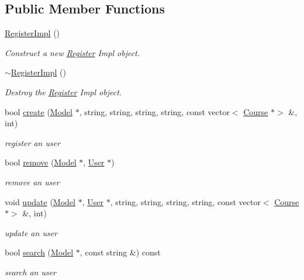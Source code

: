 \subsection*{Public Member Functions}
\begin{DoxyCompactItemize}
\item 
\hyperlink{classRegisterImpl_a601b77faf4f07f51170821a189fed94f}{Register\+Impl} ()
\begin{DoxyCompactList}\small\item\em Construct a new \hyperlink{classRegister}{Register} Impl object. \end{DoxyCompactList}\item 
\hyperlink{classRegisterImpl_ab227f612d7fdd113cab53c9559b0c8f9}{$\sim$\+Register\+Impl} ()
\begin{DoxyCompactList}\small\item\em Destroy the \hyperlink{classRegister}{Register} Impl object. \end{DoxyCompactList}\item 
bool \hyperlink{classRegisterImpl_af0463a5627b02b797a4a9d5d90f55a46}{create} (\hyperlink{classModel}{Model} $\ast$, string, string, string, string, const vector$<$ \hyperlink{classCourse}{Course} $\ast$$>$ \&, int)
\begin{DoxyCompactList}\small\item\em register an user \end{DoxyCompactList}\item 
bool \hyperlink{classRegisterImpl_a528ea874f5607abfea9fea4b8cab1628}{remove} (\hyperlink{classModel}{Model} $\ast$, \hyperlink{classUser}{User} $\ast$)
\begin{DoxyCompactList}\small\item\em remove an user \end{DoxyCompactList}\item 
void \hyperlink{classRegisterImpl_a5ae0846ac09fe620501b94f5e05bcd9d}{update} (\hyperlink{classModel}{Model} $\ast$, \hyperlink{classUser}{User} $\ast$, string, string, string, string, const vector$<$ \hyperlink{classCourse}{Course} $\ast$$>$ \&, int)
\begin{DoxyCompactList}\small\item\em update an user \end{DoxyCompactList}\item 
bool \hyperlink{classRegisterImpl_ad60a7330160adae90443acb547398bd9}{search} (\hyperlink{classModel}{Model} $\ast$, const string \&) const
\begin{DoxyCompactList}\small\item\em search an user \end{DoxyCompactList}\item 

\end{DoxyCompactItemize}
